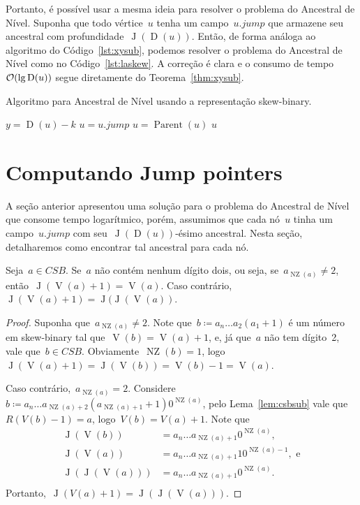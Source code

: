 \documentclass[main.tex]{subfiles}
\newcommand{\Par}{\operatorname{Parent}}
\newcommand{\Dep}{\operatorname{D}}
\newcommand{\NZ}{\operatorname{NZ}}
\newcommand{\CSB}{\textit{CSB}}
\renewcommand{\V}{\operatorname{V}}
\newcommand{\J}{\operatorname{J}}
\begin{document}
\newcommand{\jmp}{\mathit{jump}}
Portanto, é possível usar a mesma ideia para resolver o problema do Ancestral de Nível. Suponha que todo vértice~$u$ tenha um campo~$u.\jmp$ que armazene seu ancestral com profundidade~$\J(\Dep(u))$. Então, de forma análoga ao algoritmo do Código~\ref{lst:xysub}, podemos resolver o problema do Ancestral de Nível como no Código~\ref{lst:laskew}. A correção é clara e o consumo de tempo~$\Oh(\lg\Dep(u))$ segue diretamente do Teorema~\ref{thm:xysub}.

\begin{algorithm}
\caption{Algoritmo para Ancestral de Nível usando a representação skew-binary.} \label{lst:laskew}
\begin{algorithmic}[1]
		\State $y = \Dep(u) - k$
		\While{$\Dep(u) \neq y$}
			\If{$\Dep(u.\jmp) \geq y$}
				\State $u = u.\jmp$
			\Else
				\State $u = \Par(u)$
			\EndIf
		\EndWhile
		\State \Return $u$
	\EndFunction
\end{algorithmic}
\end{algorithm}

\section{Computando Jump pointers}

A seção anterior apresentou uma solução para o problema do Ancestral de Nível que consome tempo logarítmico, porém, assumimos que cada nó~$u$ tinha um campo~$u.\jmp$ com seu~$\J(\Dep(u))$-ésimo ancestral. Nesta seção, detalharemos como encontrar tal ancestral para cada nó.

\begin{theorem} \label{thm:csbj+1}
	Seja~$a \in \CSB$. Se~$a$ não contém nenhum dígito dois, ou seja, se~$a_{\NZ(a)} \neq 2$, então~$\J(\V(a) + 1) = \V(a)$. Caso contrário,~$\J(\V(a) + 1) = \J(\J(\V(a))$.
\end{theorem}
\begin{proof}
	Suponha que~$a_{\NZ(a)} \neq 2$. Note que~$b \coloneqq a_n \ldots a_2 (a_1 + 1)$ é um número em skew-binary tal que~${\V(b) = \V(a) + 1}$, e, já que~$a$ não tem dígito~2, vale que~${b \in \CSB}$. Obviamente~${\NZ(b) = 1}$, logo~${\J(\V(a) + 1) = \J(\V(b)) = \V(b) - 1 = \V(a)}$.

	Caso contrário,~${a_{\NZ(a)} = 2}$. Considere~${b \coloneqq a_n \ldots a_{\NZ(a) + 2} (a_{\NZ(a) + 1} + 1) 0^{\NZ(a)}}$, pelo Lema~\ref{lem:csbsub} vale que~${R(V(b) - 1) = a}$, logo~${V(b) = V(a) + 1}$. Note que \vspace{-2ex}
	\[
	\begin{array}{ll}
		\J(\V(b))     &= a_n \ldots a_{\NZ(a) + 1} 0^{\NZ(a)}, \\
		\J(\V(a))     &= a_n \ldots a_{\NZ(a) + 1} 10^{\NZ(a)-1},\text{ e} \\
		\J(\J(\V(a))) &= a_n \ldots a_{\NZ(a) + 1} 0^{\NZ(a)}. \\
	\end{array}
	\]
	Portanto,~$\J(V(a) + 1) = \J(\J(\V(a)))$.
\end{proof}
\end{document}
